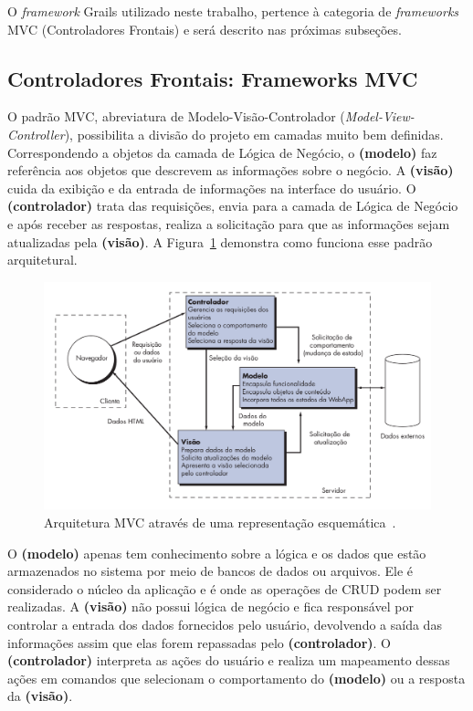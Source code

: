 O \textit{framework} Grails utilizado neste trabalho, pertence à categoria de \textit{frameworks} MVC (Controladores Frontais) e será descrito nas próximas subseções.

\subsection{Controladores Frontais: Frameworks MVC}
\label{sec-ref-framework-mvc}

O padrão MVC, abreviatura de Modelo-Visão-Controlador (\textit{Model-View-Controller}), possibilita a divisão do projeto em camadas muito bem definidas. Correspondendo a objetos da camada de Lógica de Negócio, o \textbf{(modelo)} faz referência aos objetos que descrevem as informações sobre o negócio. A \textbf{(visão)} cuida da exibição e da entrada de informações na interface do usuário. O \textbf{(controlador)} trata das requisições, envia para a camada de Lógica de Negócio e após receber as respostas, realiza a solicitação para que as informações sejam atualizadas pela \textbf{(visão)}. A Figura~\ref{fig-ref-mvc} demonstra como funciona esse padrão arquitetural.  

\begin{figure}[h]
	\centering
	\includegraphics[scale=.45]{figuras/fig-ref-mvc} 
	\caption{Arquitetura MVC através de uma representação esquemática~\cite{pressman:es11}.}
	\label{fig-ref-mvc}
\end{figure}

O \textbf{(modelo)} apenas tem conhecimento sobre a lógica e os dados que estão armazenados no sistema por meio de bancos de dados ou arquivos. Ele é considerado o núcleo da aplicação e é onde as operações de CRUD podem ser realizadas. A \textbf{(visão)} não possui lógica de negócio e fica responsável por controlar a entrada dos dados fornecidos pelo usuário, devolvendo a saída das informações assim que elas forem repassadas pelo \textbf{(controlador)}. O \textbf{(controlador)} interpreta as ações do usuário e realiza um mapeamento dessas ações em comandos que selecionam o comportamento do \textbf{(modelo)} ou a resposta da \textbf{(visão)}.  

